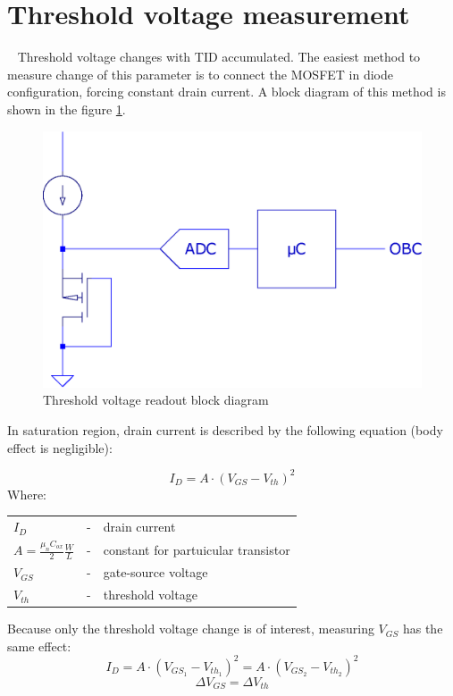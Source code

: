 \section{Threshold voltage measurement}
    Threshold voltage changes with TID accumulated. The easiest method to measure change of this parameter is to connect the MOSFET in diode configuration, forcing constant drain current. A block diagram of this method is shown in the figure \ref{Vth_readout_block_diagram}.

    \begin{figure}[H]
        \centering
        \includegraphics[width=0.3\paperwidth]{img/05/conceptual_block_diagram.eps}
        \caption{Threshold voltage readout block diagram}
        \label{Vth_readout_block_diagram}
    \end{figure}

    In saturation region, drain current is described by the following equation (body effect is negligible):

    $$I_D = A \cdot (V_{GS} - V_{th})^2$$
    Where:

    \begin{tabular}{lcl}
        $I_D$ & - & drain current \\
        $A = \frac{\mu_n C_{ox}}{2} \frac{W}{L}$ & - & constant for partuicular transistor \\
        $V_{GS}$ & - & gate-source voltage \\
        $V_{th}$ & - & threshold voltage \\
    \end{tabular}
    \bigskip

    Because only the threshold voltage change is of interest, measuring $V_{GS}$ has the same effect:
    $$I_D = A \cdot (V_{GS_1} - V_{th_1})^2 = A \cdot (V_{GS_2} - V_{th_2})^2$$
    $$\Delta V_{GS} = \Delta V_{th}$$


